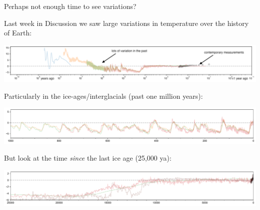 \documentclass[12pt]{beamer}
\begin{document}
\begin{frame}{Perhaps not enough time to see variations?}

{\small Last week in Discussion we saw large variations in temperature over the history of Earth:}
%
\begin{center}
\includegraphics[width=\textwidth]{images/row5_log-all_marked-up.pdf}
\end{center}
%
{\small Particularly in the ice-ages/interglacials (past one million years):}
%
\begin{center}
\includegraphics[width=\textwidth]{images/row3_1Mya.pdf}
\end{center}
%
{\small But look at the time {\em since} the last ice age (25,000 ya):}
%
\begin{center}
\includegraphics[width=\textwidth]{images/row4_25kya.pdf}
\end{center}
%

\end{frame}
\end{document}

